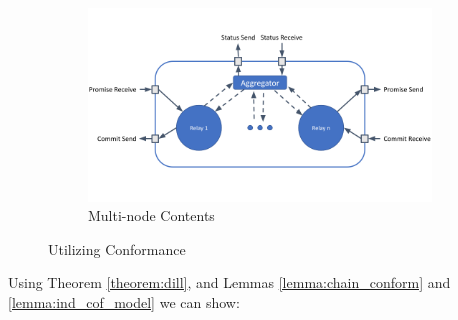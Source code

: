 \documentclass[runningheads]{llncs}
\newif\ifcomments
\newif\ifkylecomments
\newcommand{\egm}[1]{\ifcomments\textcolor{orange}{egm: #1}\fi}
\newcommand{\krs}[1]{\ifkylecomments\textcolor{blue}{krs: #1}\fi}
\begin{document}
\begin{figure}
\begin{subfigure}[b]{0.4\textwidth}
         \label{fig:singlenodebox}
     \end{subfigure}
     \hfill
     \begin{subfigure}[b]{0.4\textwidth}
         \centering
         \includegraphics[width=1.4\textwidth]{paper/MultiNodeBlackBox.png}
         \caption{Multi-node Contents}
        \label{fig:multinodebox}
     \end{subfigure}
        \caption{Utilizing Conformance}
         \label{fig:allblackbox}
\end{figure}



\krs{Yeah this was a mess. I wanted to present the lemmas in one order, but the proof for the first lemma relied on context from the proof for the second lemma so the sections had to be swapped. I reworked it to present the lemmas in the opposite order so it works out.\egm{Reference sections in order. Same with Lemmas etc. Also, through the entire paper, add a proof to each of the lemmas and statements that simple says "See section x" where x is the section where the proof lives. It's hard to keep track of where everything is eventually proved out.}}

\pagebreak
Using Theorem \ref{theorem:dill}, and Lemmas \ref{lemma:chain_conform} and \ref{lemma:ind_cof_model} we can show:
\end{document}
